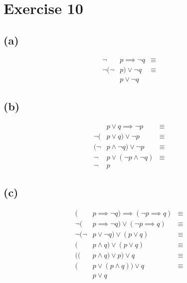\documentclass{article}
\begin{document}
\pagebreak

\section{Exercise 10}

\subsection{(a)}
\begin{align*}
	\neg       & p \implies \neg q & \equiv \\
	\neg (\neg & p) \lor \neg q    & \equiv \\
	           & p \lor \neg q
\end{align*}

\subsection{(b)}
\begin{align*}
	       & p \lor q \implies \neg p     & \equiv \\
	\neg ( & p \lor q) \lor \neg p        & \equiv \\
	(\neg  & p \land \neg q) \lor \neg p  & \equiv \\
	\neg   & p \lor (\neg p \land \neg q) & \equiv \\
	\neg   & p
\end{align*}

\subsection{(c)}
\begin{align*}
	(          & p \implies \neg q) \implies (\neg p \implies q) & \equiv \\
	\neg (     & p \implies \neg q) \lor (\neg p \implies q)     & \equiv \\
	\neg (\neg & p \lor \neg q) \lor (p \lor q)                  & \equiv \\
	(          & p \land q) \lor (p \lor q)                      & \equiv \\
	((         & p \land q) \lor p) \lor q                       & \equiv \\
	(          & p \lor (p \land q)) \lor q                      & \equiv \\
	           & p \lor q
\end{align*}
\end{document}
